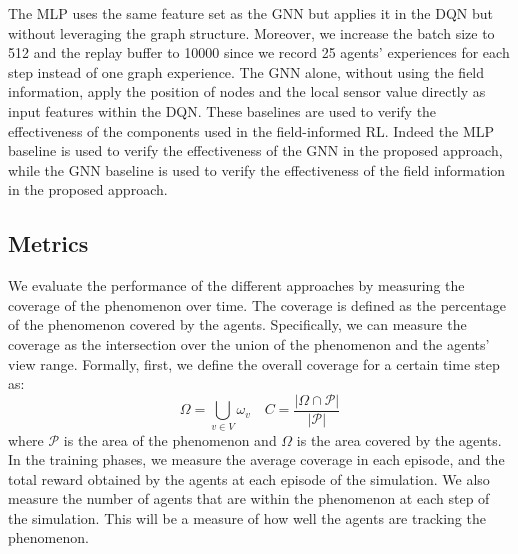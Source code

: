 \documentclass[conference]{IEEEtran}
\begin{document}
The \ac{MLP} uses the same feature set as the \ac{GNN} but applies it in the \ac{DQN} but 
without leveraging the graph structure. Moreover, we increase the batch size to 512 and the replay buffer to 10000 since we record 25 agents' experiences for each step instead of one graph experience.
%
The \ac{GNN} alone, without using the field information, apply the position of nodes and the local sensor value directly as input features within the \ac{DQN}.
%
These baselines are used to verify the effectiveness of the components used in the field-informed \ac{RL}. 
%
Indeed the \ac{MLP} baseline is used to verify the effectiveness of the \ac{GNN} in the proposed approach, while the \ac{GNN} baseline is used to verify the effectiveness of the field information in the proposed approach.
\subsection{Metrics}
We evaluate the performance of the different approaches by measuring the coverage of the phenomenon over time.
%
The coverage is defined as the percentage of the phenomenon covered by the agents.
%
Specifically, we can measure the coverage as the intersection over the union of the phenomenon and the agents' view range.
%
Formally, first, we define the overall coverage for a certain time step as:
\begin{equation*}
\Omega = \bigcup_{v \in V} \omega_v
\quad 
C = \frac{|\Omega \cap \mathcal{P}|}{|\mathcal{P}|}
\end{equation*}
where $\mathcal{P}$ is the area of the phenomenon and $\Omega$ is the area covered by the agents.
In the training phases, 
 we measure the average coverage in each episode, and the total reward obtained by the agents at each episode of the simulation. 
%
We also measure the number of agents that are within the phenomenon at each step of the simulation.
This will be a measure of how well the agents are tracking the phenomenon.
\end{document}
